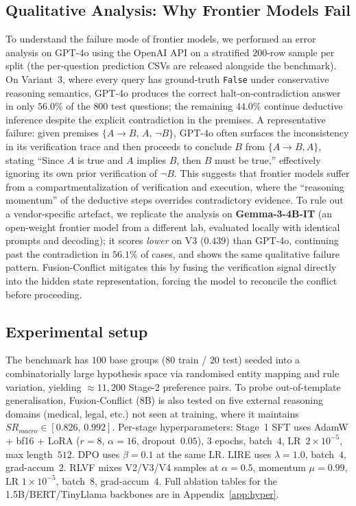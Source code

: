 \documentclass{article} %
\begin{document}
\subsection{Qualitative Analysis: Why Frontier Models Fail}
To understand the failure mode of frontier models, we performed an error analysis on GPT-4o using the OpenAI API on a stratified $200$-row sample per split (the per-question prediction CSVs are released alongside the benchmark). On Variant~3, where every query has ground-truth \texttt{False} under conservative reasoning semantics, GPT-4o produces the correct halt-on-contradiction answer in only $56.0\%$ of the $800$ test questions; the remaining $44.0\%$ continue deductive inference despite the explicit contradiction in the premises. A representative failure: given premises $\{A \to B,\, A,\, \neg B\}$, GPT-4o often surfaces the inconsistency in its verification trace and then proceeds to conclude $B$ from $\{A \to B, A\}$, stating ``Since $A$ is true and $A$ implies $B$, then $B$ must be true,'' effectively ignoring its own prior verification of $\neg B$. This suggests that frontier models suffer from a compartmentalization of verification and execution, where the ``reasoning momentum'' of the deductive steps overrides contradictory evidence. To rule out a vendor-specific artefact, we replicate the analysis on \textbf{Gemma-3-4B-IT} (an open-weight frontier model from a different lab, evaluated locally with identical prompts and decoding); it scores \emph{lower} on V3 ($0.439$) than GPT-4o, continuing past the contradiction in $56.1\%$ of cases, and shows the same qualitative failure pattern. Fusion-Conflict mitigates this by fusing the verification signal directly into the hidden state representation, forcing the model to reconcile the conflict before proceeding.

\subsection{Experimental setup}
The benchmark has $100$ base groups ($80$ train / $20$ test) seeded into a combinatorially large hypothesis space via randomised entity mapping and rule variation, yielding $\approx\!11{,}200$ Stage-2 preference pairs. To probe out-of-template generalisation, Fusion-Conflict (8B) is also tested on five external reasoning domains (medical, legal, etc.) not seen at training, where it maintains $SR_{macro}\in[0.826,\,0.992]$. Per-stage hyperparameters: Stage~1 SFT uses AdamW + bf16 + LoRA ($r{=}8$, $\alpha{=}16$, dropout~$0.05$), $3$ epochs, batch~$4$, LR~$2{\times}10^{-5}$, max length~$512$. DPO uses $\beta{=}0.1$ at the same LR. LIRE uses $\lambda{=}1.0$, batch~$4$, grad-accum~$2$. RLVF mixes V2/V3/V4 samples at $\alpha{=}0.5$, momentum $\mu{=}0.99$, LR $1{\times}10^{-5}$, batch~$8$, grad-accum~$4$. Full ablation tables for the 1.5B/BERT/TinyLlama backbones are in Appendix~\ref{app:hyper}.
\end{document}

